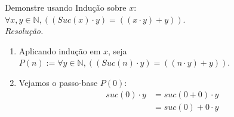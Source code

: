 Demonstre usando Indução sobre $x$: $\forall x,y \in \mathbb{N}, ((Suc(x) \cdot y) = ((x \cdot y) + y))$. \\
\emph{Resolução.}
\begin{enumerate}
	\item Aplicando indução em $x$, seja $P(n) := \forall y \in \mathbb{N}, ((Suc(n) \cdot y) = ((n \cdot y) + y))$. \\
	\item Vejamos o passo-base $P(0)$:
		\begin{align*}
			suc(0) \cdot y &= suc(0 + 0) \cdot y \\ &=
			suc(0) + 0 \cdot y 
		\end{align*}
\end{enumerate}

